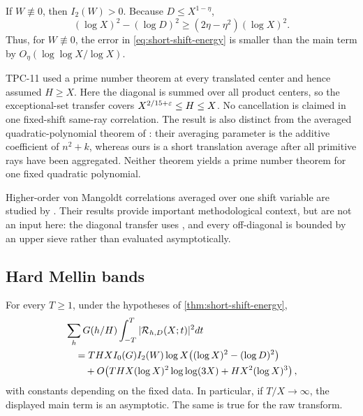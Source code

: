 If $W\not\equiv0$, then $I_2(W)>0$.  Because
$D\leq X^{1-\eta}$,
\begin{equation}
 (\log X)^2-(\log D)^2
 \geq(2\eta-\eta^2)(\log X)^2.
 \label{eq:D-main-lower-bound}
\end{equation}
Thus, for $W\not\equiv0$, the error in
\eqref{eq:short-shift-energy} is smaller than the main
term by $O_{\eta}(\log\log X/\log X)$.

\begin{remark}
TPC-11 used a prime number theorem at every translated center and hence
assumed $H\geq X$.  Here the diagonal is summed over all product centers,
so the exceptional-set transfer covers
$X^{2/15+\varepsilon}\leq H\leq X$.  No cancellation is claimed in one fixed-shift
same-ray correlation.  The result is also distinct from the averaged
quadratic-polynomial theorem of \citet{BaierZhao2009}: their averaging
parameter is the additive coefficient of $n^2+k$, whereas ours is a
short translation average after all primitive rays have been aggregated.
Neither theorem yields a prime number theorem for one fixed quadratic
polynomial.
\end{remark}

\begin{remark}
Higher-order von Mangoldt correlations averaged over one shift variable
are studied by \citet{MatomakiEtAl2026}.  Their results provide important
methodological context, but are not an input here: the diagonal transfer
uses \citet{GuthMaynard2026}, and every off-diagonal is bounded by an
upper sieve rather than evaluated asymptotically.
\end{remark}

\subsection{Hard Mellin bands}

\begin{corollary}
\label{cor:short-hard-band}
For every $T\geq1$, under the hypotheses of
\cref{thm:short-shift-energy},
\begin{equation}
 \begin{aligned}
 &\sum_hG(h/H)
 \int_{-T}^{T}|\mathcal R_{h,D}(X;t)|^2dt\\
 &\quad={}
 THX I_0(G)I_2(W)\log X
 \bigl((\log X)^2-(\log D)^2\bigr)\\
 &\qquad+O\!\left(
 THX(\log X)^2\log\log(3X)
 +HX^2(\log X)^3
 \right),
 \end{aligned}
 \label{eq:short-hard-band}
\end{equation}
with constants depending on the fixed data.  In particular, if
$T/X\to\infty$, the displayed main term is an asymptotic.  The same is
true for the raw transform.
\end{corollary}

